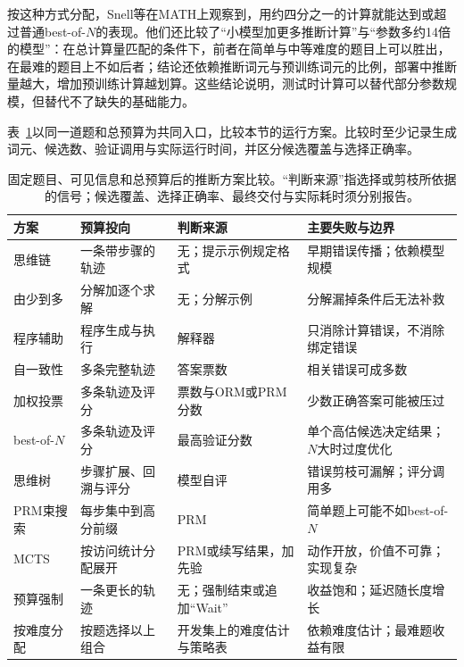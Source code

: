 按这种方式分配，Snell等在MATH上观察到，用约四分之一的计算就能达到或超过普通best-of-$N$的表现。他们还比较了“小模型加更多推断计算”与“参数多约14倍的模型”：在总计算量匹配的条件下，前者在简单与中等难度的题目上可以胜出，在最难的题目上不如后者；结论还依赖推断词元与预训练词元的比例，部署中推断量越大，增加预训练计算越划算。这些结论说明，测试时计算可以替代部分参数规模，但替代不了缺失的基础能力。

表~\ref{tab:nlp-reasoning-inference-options}以同一道题和总预算为共同入口，比较本节的运行方案。比较时至少记录生成词元、候选数、验证调用与实际运行时间，并区分候选覆盖与选择正确率。

\begin{table}[htbp]
  \centering
  \small
  \caption{固定题目、可见信息和总预算后的推断方案比较。“判断来源”指选择或剪枝所依据的信号；候选覆盖、选择正确率、最终交付与实际耗时须分别报告。}
  \label{tab:nlp-reasoning-inference-options}
  \begin{tabularx}{\linewidth}{@{}p{24mm}p{30mm}p{34mm}X@{}}
    \toprule
    方案 & 预算投向 & 判断来源 & 主要失败与边界\\
    \midrule
    思维链 & 一条带步骤的轨迹 & 无；提示示例规定格式 & 早期错误传播；依赖模型规模\\
    由少到多 & 分解加逐个求解 & 无；分解示例 & 分解漏掉条件后无法补救\\
    程序辅助 & 程序生成与执行 & 解释器 & 只消除计算错误，不消除绑定错误\\
    自一致性 & 多条完整轨迹 & 答案票数 & 相关错误可成多数\\
    加权投票 & 多条轨迹及评分 & 票数与ORM或PRM分数 & 少数正确答案可能被压过\\
    best-of-$N$ & 多条轨迹及评分 & 最高验证分数 & 单个高估候选决定结果；$N$大时过度优化\\
    思维树 & 步骤扩展、回溯与评分 & 模型自评 & 错误剪枝可漏解；评分调用多\\
    PRM束搜索 & 每步集中到高分前缀 & PRM & 简单题上可能不如best-of-$N$\\
    MCTS & 按访问统计分配展开 & PRM或续写结果，加先验 & 动作开放，价值不可靠；实现复杂\\
    预算强制 & 一条更长的轨迹 & 无；强制结束或追加“Wait” & 收益饱和；延迟随长度增长\\
    按难度分配 & 按题选择以上组合 & 开发集上的难度估计与策略表 & 依赖难度估计；最难题收益有限\\
    \bottomrule
  \end{tabularx}
\end{table}

